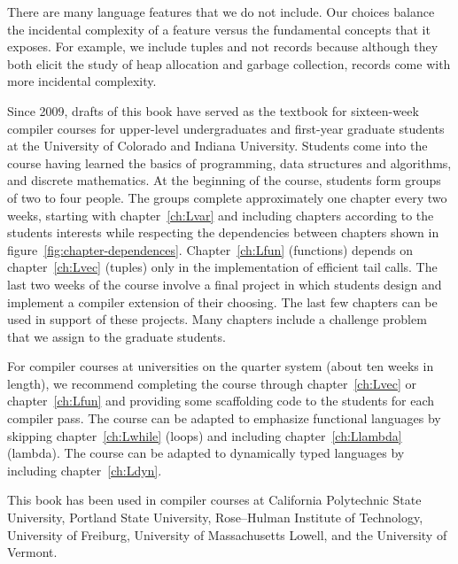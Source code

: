\documentclass[7x10]{TimesAPriori_MIT}%
\numberwithin{theorem}{chapter}
\numberwithin{definition}{chapter}
\numberwithin{equation}{chapter}
\begin{document}
There are many language features that we do not include. Our choices
balance the incidental complexity of a feature versus the fundamental
concepts that it exposes. For example, we include tuples and not
records because although they both elicit the study of heap allocation and
garbage collection, records come with more incidental complexity.

Since 2009, drafts of this book have served as the textbook for
sixteen-week compiler courses for upper-level undergraduates and
first-year graduate students at the University of Colorado and Indiana
University.
%
Students come into the course having learned the basics of
programming, data structures and algorithms, and discrete
mathematics.
%
At the beginning of the course, students form groups of two to four
people.  The groups complete approximately one chapter every two
weeks, starting with chapter~\ref{ch:Lvar} and including chapters
according to the students interests while respecting the dependencies
between chapters shown in
figure~\ref{fig:chapter-dependences}. Chapter~\ref{ch:Lfun}
(functions) depends on chapter~\ref{ch:Lvec} (tuples) only in the
implementation of efficient tail calls.
%
The last two weeks of the course involve a final project in which
students design and implement a compiler extension of their choosing.
The last few chapters can be used in support of these projects.  Many
chapters include a challenge problem that we assign to the graduate
students.

For compiler courses at universities on the quarter system
(about ten weeks in length), we recommend completing the course
through chapter~\ref{ch:Lvec} or chapter~\ref{ch:Lfun} and providing
some scaffolding code to the students for each compiler pass.
%
The course can be adapted to emphasize functional languages by
skipping chapter~\ref{ch:Lwhile} (loops) and including
chapter~\ref{ch:Llambda} (lambda). The course can be adapted to
dynamically typed languages by including chapter~\ref{ch:Ldyn}.

This book has been used in compiler courses at California Polytechnic
State University, Portland State University, Rose–Hulman Institute of
Technology, University of Freiburg, University of Massachusetts
Lowell, and the University of Vermont.
\end{document}
